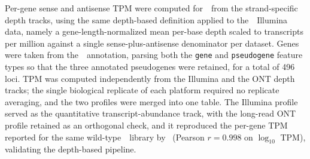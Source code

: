 Per-gene sense and antisense TPM were computed for~\syna~from the strand-specific depth tracks, using the same depth-based definition applied to the~\syn~Illumina data, namely a gene-length-normalized mean per-base depth scaled to transcripts per million against a single sense-plus-antisense denominator per dataset.
Genes were taken from the~\syna~annotation, parsing both the \texttt{gene} and \texttt{pseudogene} feature types so that the three annotated pseudogenes were retained, for a total of 496 loci.
TPM was computed independently from the Illumina and the ONT depth tracks; the single biological replicate of each platform required no replicate averaging, and the two profiles were merged into one table.
The Illumina profile served as the quantitative transcript-abundance track, with the long-read ONT profile retained as an orthogonal check, and it reproduced the per-gene TPM reported for the same wild-type~\syna~library by~\cite{sandberg_adaptive_2023} (Pearson $r = 0.998$ on $\log_{10}$ TPM), validating the depth-based pipeline.
